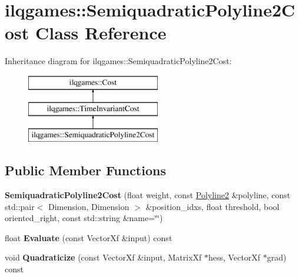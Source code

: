 \hypertarget{classilqgames_1_1_semiquadratic_polyline2_cost}{}\section{ilqgames\+:\+:Semiquadratic\+Polyline2\+Cost Class Reference}
\label{classilqgames_1_1_semiquadratic_polyline2_cost}
Inheritance diagram for ilqgames\+:\+:Semiquadratic\+Polyline2\+Cost\+:\begin{figure}[H]
\begin{center}
\leavevmode
\includegraphics[height=3.000000cm]{classilqgames_1_1_semiquadratic_polyline2_cost}
\end{center}
\end{figure}
\subsection*{Public Member Functions}
\begin{DoxyCompactItemize}
\item 
{\bfseries Semiquadratic\+Polyline2\+Cost} (float weight, const \hyperlink{classilqgames_1_1_polyline2}{Polyline2} \&polyline, const std\+::pair$<$ Dimension, Dimension $>$ \&position\+\_\+idxs, float threshold, bool oriented\+\_\+right, const std\+::string \&name=\char`\"{}\char`\"{})\hypertarget{classilqgames_1_1_semiquadratic_polyline2_cost_a7e928410aef0e930024890fb519b1290}{}\label{classilqgames_1_1_semiquadratic_polyline2_cost_a7e928410aef0e930024890fb519b1290}

\item 
float {\bfseries Evaluate} (const Vector\+Xf \&input) const \hypertarget{classilqgames_1_1_semiquadratic_polyline2_cost_abe1063a923c02e53e3512b4de85539b8}{}\label{classilqgames_1_1_semiquadratic_polyline2_cost_abe1063a923c02e53e3512b4de85539b8}

\item 
void {\bfseries Quadraticize} (const Vector\+Xf \&input, Matrix\+Xf $\ast$hess, Vector\+Xf $\ast$grad) const \hypertarget{classilqgames_1_1_semiquadratic_polyline2_cost_a74b1ce98fe98f50560f21751a7c855f2}{}\label{classilqgames_1_1_semiquadratic_polyline2_cost_a74b1ce98fe98f50560f21751a7c855f2}

\end{DoxyCompactItemize}
